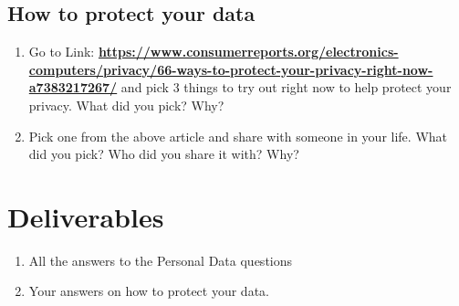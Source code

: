 \documentclass[12pt]{article}
\begin{document}
\subsection*{How to protect your data}
\begin{enumerate}
    \item Go to Link: \href{https://www.consumerreports.org/electronics-computers/privacy/66-ways-to-protect-your-privacy-right-now-a7383217267/}{\textbf{https://www.consumerreports.org/electronics-computers/privacy/66-ways-to-protect-your-privacy-right-now-a7383217267/}} and pick 3 things to try out right now to help protect your privacy.  What did you pick? Why?
    \item Pick one from the above article and share with someone in your life.  What did you pick? Who did you share it with? Why?
\end{enumerate}

\section*{Deliverables}

\begin{enumerate}
    \item All the answers to the Personal Data questions
    \item Your answers on how to protect your data. 

\end{enumerate}
\end{document}
